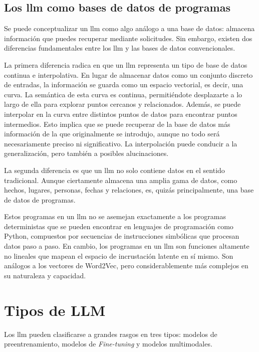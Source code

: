\subsection{Los \acrshort{llm} como bases de datos de programas}

Se puede conceptualizar un \acrfull{llm} como algo análogo a una base de datos: almacena información que puedes recuperar mediante solicitudes. Sin embargo, existen dos diferencias fundamentales entre los \acrshort{llm} y las bases de datos convencionales.

La primera diferencia radica en que un \acrshort{llm} representa un tipo de base de datos continua e interpolativa. En lugar de almacenar datos como un conjunto discreto de entradas, la información se guarda como un espacio vectorial, es decir, una curva. La semántica de esta curva es continua, permitiéndote desplazarte a lo largo de ella para explorar puntos cercanos y relacionados. Además, se puede interpolar en la curva entre distintos puntos de datos para encontrar puntos intermedios. Esto implica que se puede recuperar de la base de datos más información de la que originalmente se introdujo, aunque no todo será necesariamente preciso ni significativo. La interpolación puede conducir a la generalización, pero también a posibles alucinaciones.

La segunda diferencia es que un \acrshort{llm} no solo contiene datos en el sentido tradicional. Aunque ciertamente almacena una amplia gama de datos, como hechos, lugares, personas, fechas y relaciones, es, quizás principalmente, una base de datos de programas.

Estos programas en un \acrshort{llm} no se asemejan exactamente a los programas deterministas que se pueden encontrar en lenguajes de programación como Python, compuestos por secuencias de instrucciones simbólicas que procesan datos paso a paso. En cambio, los programas en un \acrshort{llm} son funciones altamente no lineales que mapean el espacio de incrustación latente en sí mismo. Son análogos a los vectores de Word2Vec, pero considerablemente más complejos en su naturaleza y capacidad.

\section{Tipos de LLM}

Los \acrlong{llm} pueden clasificarse a grandes rasgos en tres tipos: modelos de preentrenamiento, modelos de \textit{Fine-tuning} y modelos multimodales\cite{scribbleData}.

